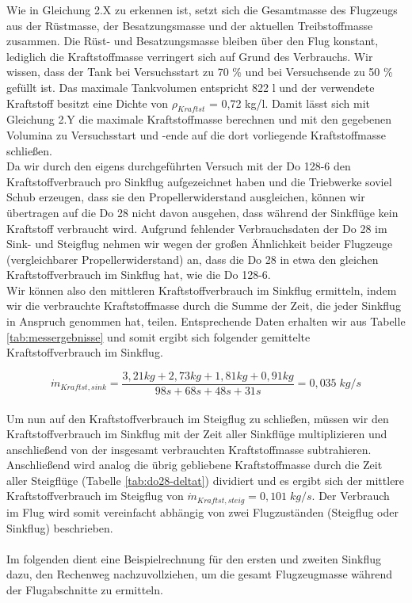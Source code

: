 \noindent Wie in Gleichung 2.X zu erkennen ist, setzt sich die Gesamtmasse des Flugzeugs aus der Rüstmasse, der Besatzungsmasse und der aktuellen Treibstoffmasse zusammen. Die Rüst- und Besatzungsmasse bleiben über den Flug konstant, lediglich die Kraftstoffmasse verringert sich auf Grund des Verbrauchs. Wir wissen, dass der Tank bei Versuchsstart zu 70 \% und bei Versuchsende zu 50 \% gefüllt ist. Das maximale Tankvolumen entspricht 822 {l} und der verwendete Kraftstoff besitzt eine Dichte von $\rho_{Kraftst}$ = 0,72 {kg/l}. Damit lässt sich mit Gleichung 2.Y die maximale Kraftstoffmasse berechnen und mit den gegebenen Volumina zu Versuchsstart und -ende auf die dort vorliegende Kraftstoffmasse schließen.
\\
Da wir durch den eigens durchgeführten Versuch mit der Do 128-6 den Kraftstoffverbrauch pro Sinkflug aufgezeichnet haben und die Triebwerke soviel Schub erzeugen, dass sie den Propellerwiderstand ausgleichen, können wir übertragen auf die Do 28 nicht davon ausgehen, dass während der Sinkflüge kein Kraftstoff verbraucht wird. Aufgrund fehlender Verbrauchsdaten der Do 28 im Sink- und Steigflug nehmen wir wegen der großen Ähnlichkeit beider Flugzeuge (vergleichbarer Propellerwiderstand) an, dass die Do 28 in etwa den gleichen Kraftstoffverbrauch im Sinkflug hat, wie die Do 128-6.
\\
Wir können also den mittleren Kraftstoffverbrauch im Sinkflug ermitteln, indem wir die verbrauchte Kraftstoffmasse durch die Summe der Zeit, die jeder Sinkflug in Anspruch genommen hat, teilen. Entsprechende Daten erhalten wir aus Tabelle \ref{tab:messergebnisse} und somit ergibt sich folgender gemittelte Kraftstoffverbrauch im Sinkflug.

\begin{equation}
	\dot{m}_{Kraftst,sink} = \frac{3,21kg + 2,73kg + 1,81kg + 0,91kg}{98 s + 68 s + 48 s + 31 s} = 0,035 \; {kg/s}
\end{equation}
\\
Um nun auf den Kraftstoffverbrauch im Steigflug zu schließen, müssen wir den Kraftstoffverbrauch im Sinkflug mit der Zeit aller Sinkflüge multiplizieren und anschließend von der insgesamt verbrauchten Kraftstoffmasse subtrahieren. Anschließend wird analog die übrig gebliebene Kraftstoffmasse durch die Zeit aller Steigflüge (Tabelle \ref{tab:do28-deltat}) dividiert und es ergibt sich der mittlere Kraftstoffverbrauch im Steigflug von $\dot{m}_{Kraftst,steig} = 0,101 \; {kg/s}$. Der Verbrauch im Flug wird somit vereinfacht abhängig von zwei Flugzuständen (Steigflug oder Sinkflug) beschrieben.\\\\
Im folgenden dient eine Beispielrechnung für den ersten und zweiten Sinkflug dazu, den Rechenweg nachzuvollziehen, um die gesamt Flugzeugmasse während der Flugabschnitte zu ermitteln.
\\


